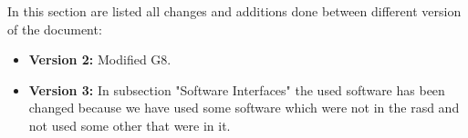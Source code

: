 In this section are listed all changes and additions done between different version of the document:
\begin{itemize}
	\item \textbf{Version 2:} Modified G8.
	\item \textbf{Version 3:} In subsection "Software Interfaces" the used software has been changed because we have used some 		software which were not in the rasd and not used some other that were in it.
\end{itemize}